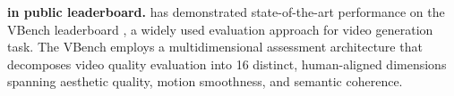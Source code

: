 


\textbf{\method in public leaderboard.}
\method has demonstrated state-of-the-art performance on the VBench leaderboard \citep{2023VBench}, a widely used evaluation approach for video generation task. 
The VBench employs a multidimensional assessment architecture that decomposes video quality evaluation into 16 distinct, human-aligned dimensions spanning aesthetic quality, motion smoothness, and semantic coherence. 


